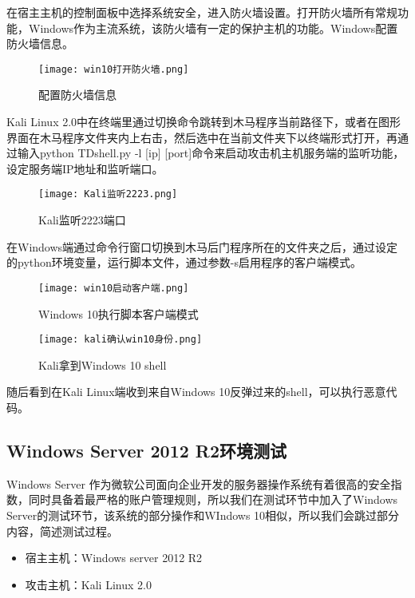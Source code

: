 在宿主主机的控制面板中选择系统安全，进入防火墙设置。打开防火墙所有常规功能，Windows作为主流系统，该防火墙有一定的保护主机的功能。Windows配置防火墙信息。
\begin{figure}[h]
\centering
\texttt{[image: win10打开防火墙.png]}
\caption{配置防火墙信息}
\label{fig:7}
\end{figure}



Kali Linux 2.0中在终端里通过切换命令跳转到木马程序当前路径下，或者在图形界面在木马程序文件夹内上右击，然后选中在当前文件夹下以终端形式打开，再通过输入python TDshell.py -l [ip] [port]命令来启动攻击机主机服务端的监听功能，设定服务端IP地址和监听端口。

\begin{figure}[!h]
\centering
\texttt{[image: Kali监听2223.png]}
\caption{Kali监听2223端口}
\label{fig:3}
\end{figure}
在Windows端通过命令行窗口切换到木马后门程序所在的文件夹之后，通过设定的python环境变量，运行脚本文件，通过参数-s启用程序的客户端模式。

\begin{figure}[!h]
\centering
\texttt{[image: win10启动客户端.png]}
\caption{Windows 10执行脚本客户端模式}
\label{fig:4}
\end{figure}

\begin{figure}[!h]
\centering
\texttt{[image: kali确认win10身份.png]}
\caption{Kali拿到Windows 10 shell}
\label{fig:5}
\end{figure}

随后看到在Kali Linux端收到来自Windows 10反弹过来的shell，可以执行恶意代码。




\subsection{Windows Server 2012 R2环境测试}
Windows Server 作为微软公司面向企业开发的服务器操作系统有着很高的安全指数，同时具备着最严格的账户管理规则，所以我们在测试环节中加入了Windows Server的测试环节，该系统的部分操作和WIndows 10相似，所以我们会跳过部分内容，简述测试过程。


\begin{itemize}
	\item 宿主主机：Windows server 2012 R2
	\item 攻击主机：Kali Linux 2.0
\end{itemize}



